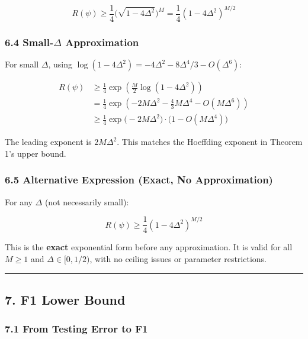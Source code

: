 \documentclass[
  12pt,
]{article}
\begin{document}
\[R(\psi) \geq \frac14 \bigl(\sqrt{1-4\Delta^2}\bigr)^M = \frac14 (1-4\Delta^2)^{M/2}\]

\subsubsection{\texorpdfstring{6.4 Small-\(\Delta\)
Approximation}{6.4 Small-\textbackslash Delta Approximation}}\label{small-delta-approximation}

For small \(\Delta\), using
\(\log(1-4\Delta^2) = -4\Delta^2 - 8\Delta^4/3 - O(\Delta^6)\):

\[\begin{aligned}
R(\psi) &\geq \frac14 \exp\!\left(\frac{M}{2} \log(1-4\Delta^2)\right) \\
&= \frac14 \exp\!\left(-2M\Delta^2 - \frac{4}{3}M\Delta^4 - O(M\Delta^6)\right) \\
&\geq \frac14 \exp\!\bigl(-2M\Delta^2\bigr) \cdot \bigl(1 - O(M\Delta^4)\bigr)
\end{aligned}\]

The leading exponent is \(2M\Delta^2\). This matches the Hoeffding
exponent in Theorem 1's upper bound.

\subsubsection{6.5 Alternative Expression (Exact, No
Approximation)}\label{alternative-expression-exact-no-approximation}

For any \(\Delta\) (not necessarily small):

\[R(\psi) \geq \frac14 (1-4\Delta^2)^{M/2}\]

This is the \textbf{exact} exponential form before any approximation. It
is valid for all \(M \geq 1\) and \(\Delta \in [0, 1/2)\), with no
ceiling issues or parameter restrictions.

\begin{center}\rule{0.5\linewidth}{0.5pt}\end{center}

\subsection{7. F1 Lower Bound}\label{f1-lower-bound}

\subsubsection{7.1 From Testing Error to
F1}\label{from-testing-error-to-f1}
\end{document}
